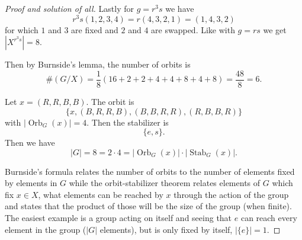 \begin{proof}[Proof and solution of all]
    Lastly for 
    $g = r^3s$ we have 
    \[
        r^3 s(1,2,3,4) = r(4,3,2,1) = (1,4,3,2)
    \]
    for which $1$ and $3$ are fixed and $2$ and $4$ are swapped. 
    Like with $g = rs$ we get 
    $|X^{r^3s}| = 8$.

    Then by Burnside's lemma, the number of orbits is 
    \[
        \#(G/X) = 
        \frac{1}{8} (16 + 2 + 2 + 4 + 4 + 8 + 4 + 8) 
        = \frac{48}{8} = 6.
    \]

    Let $x = (R,R,B,B)$. The orbit is 
    \[
        \{x, (B,R,R,B), (B,B,R,R), (R,B,B,R)\}
    \]
    with $|\operatorname{Orb}_G(x)| = 4$.
    Then the stabilizer is 
    \[
        \{e,s\}.
    \]
    Then we have 
    \[
        |G| = 8 = 2 \cdot 4 = |\operatorname{Orb}_G(x)| \cdot 
        |\operatorname{Stab}_G(x)|.
    \]

    Burnside's formula relates the number of orbits to 
    the number of elements fixed by elements in $G$ while 
    the orbit-stabilizer theorem relates 
    elements of $G$ which fix $x \in X$, what 
    elements can be reached by $x$ through the action of the group 
    and states that the product of those will be the size of the 
    group (when finite). The easiest example is a group acting on 
    itself and seeing that $e$ can reach every element in the 
    group ($|G|$ elements), but is only fixed by itself, 
    $|\{e\}| = 1$. 
\end{proof}

